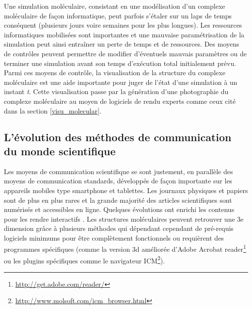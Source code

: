 Une simulation moléculaire, consistant en une modélisation d'un complexe moléculaire de façon informatique, peut parfois s'étaler sur un laps de temps conséquent (plusieurs jours voire semaines pour les plus longues). Les ressources informatiques mobilisées sont importantes et une mauvaise paramétrisation de la simulation peut ainsi entraîner un perte de temps et de ressources. Des moyens de contrôles peuvent permettre de modifier d'éventuels mauvais paramètres ou de terminer une simulation avant son temps d'exécution total initialement prévu. Parmi ces moyens de contrôle, la visualisation de la structure du complexe moléculaire est une aide importante pour juger de l'état d'une simulation à un instant \textit{t}.
Cette visualisation passe par la génération d'une photographie du complexe moléculaire au moyen de logiciels de rendu experts comme ceux cité dans la section \ref{visu_molecular}.


\subsection{L'évolution des méthodes de communication du monde scientifique}

Les moyens de communication scientifique se sont justement, en parallèle des moyens de communication standards, développés de façon importante sur les appareils mobiles type smartphone et tablettes. Les journaux physiques et papiers sont de plus en plus rares et la grande majorité des articles scientifiques sont numérisés et accessibles en ligne. %
Quelques évolutions ont enrichi les contenus pour les rendre interactifs \cite{attwood2010utopia}. Les structures moléculaires peuvent retrouver une 3e dimension grâce à plusieurs méthodes \cite{kumar2008grasping,raush2009new} qui dépendant cependant de pré-requis logiciels minimums pour être complètement fonctionnels ou requièrent des programmes spécifiques (comme la version 3d améliorée d'Adobe Acrobat reader\footnote{\url{http://get.adobe.com/reader/}} ou les plugins spécifiques comme le navigateur ICM\footnote{\url{http://www.molsoft.com/icm_browser.html}}).


